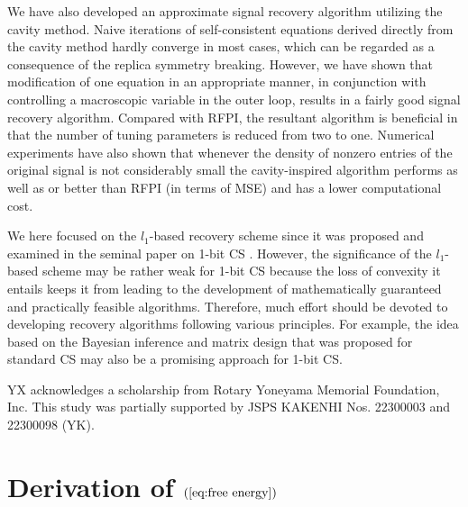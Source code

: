 \documentclass[12pt]{iopart}
\begin{document}
We have also developed an approximate signal recovery algorithm utilizing the cavity method. Naive iterations of self-consistent equations derived directly from the cavity method hardly converge in most cases, which can be regarded as a consequence of the replica symmetry breaking. However, we have shown that modification of one equation in an appropriate manner, in conjunction with controlling a macroscopic variable in the outer loop, results in a fairly good signal recovery algorithm. Compared with RFPI, the resultant algorithm is beneficial in that the number of tuning parameters is reduced from two to one. Numerical experiments have also shown that whenever the density of nonzero entries of the original signal is not considerably small the cavity-inspired algorithm performs as well as or better than RFPI (in terms of MSE) and has a lower computational cost. 

We here focused on the $l_1$-based recovery scheme since it was proposed and examined in the seminal paper on 1-bit CS \cite{1bitCS}. However, the significance of the $l_1$-based scheme may be rather weak for 1-bit CS because the loss of convexity it entails keeps it from leading to the development of mathematically guaranteed and practically feasible algorithms. Therefore, much effort should be devoted to developing recovery algorithms following various principles. For example, the idea based on the Bayesian inference and matrix design that was proposed for standard CS \cite{Krzakala2012} may also be a promising approach for 1-bit CS. 

\ack
YX acknowledges a scholarship from Rotary Yoneyama Memorial Foundation, Inc. This study was partially supported by JSPS KAKENHI Nos. 22300003 and 22300098 (YK).
\appendix

\section{Derivation of $(\ref{eq:free energy})$}
\label{replicaderivation}
\end{document}
